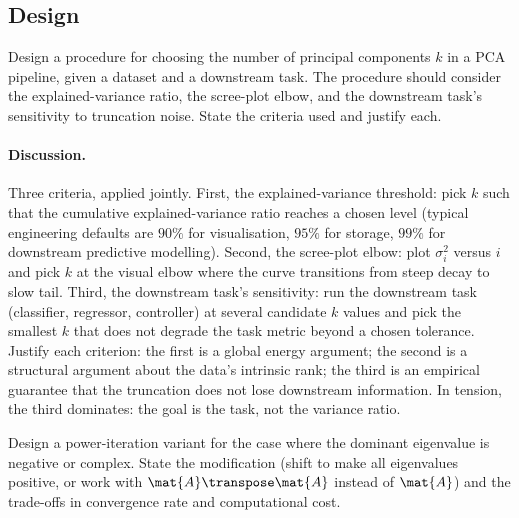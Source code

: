 \subsection*{Design}

\begin{exercise}
Design a procedure for choosing the number of principal components
$k$ in a PCA pipeline, given a dataset and a downstream task. The
procedure should consider the explained-variance ratio, the
scree-plot elbow, and the downstream task's sensitivity to
truncation noise. State the criteria used and justify each.
\end{exercise}

\paragraph{Discussion.}
Three criteria, applied jointly. First, the explained-variance
threshold: pick $k$ such that the cumulative explained-variance
ratio reaches a chosen level (typical engineering defaults are
$90\%$ for visualisation, $95\%$ for storage, $99\%$ for downstream
predictive modelling). Second, the scree-plot elbow: plot
$\sigma_{i}^{2}$ versus $i$ and pick $k$ at the visual elbow where
the curve transitions from steep decay to slow tail. Third, the
downstream task's sensitivity: run the downstream task (classifier,
regressor, controller) at several candidate $k$ values and pick the
smallest $k$ that does not degrade the task metric beyond a chosen
tolerance. Justify each criterion: the first is a global energy
argument; the second is a structural argument about the data's
intrinsic rank; the third is an empirical guarantee that the
truncation does not lose downstream information. In tension, the
third dominates: the goal is the task, not the variance ratio.

\begin{exercise}
Design a power-iteration variant for the case where the dominant
eigenvalue is negative or complex. State the modification (shift
to make all eigenvalues positive, or work with $\mat{A}\transpose
\mat{A}$ instead of $\mat{A}$) and the trade-offs in convergence
rate and computational cost.
\end{exercise}

